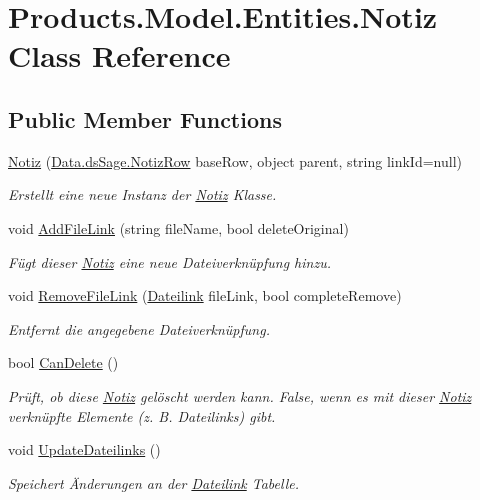 \hypertarget{class_products_1_1_model_1_1_entities_1_1_notiz}{}\section{Products.\+Model.\+Entities.\+Notiz Class Reference}
\label{class_products_1_1_model_1_1_entities_1_1_notiz}
\subsection*{Public Member Functions}
\begin{DoxyCompactItemize}
\item 
\hyperlink{class_products_1_1_model_1_1_entities_1_1_notiz_a720fd2cb505fe5f096dfdc912bbff98c}{Notiz} (\hyperlink{class_products_1_1_data_1_1ds_sage_1_1_notiz_row}{Data.\+ds\+Sage.\+Notiz\+Row} base\+Row, object parent, string link\+Id=null)
\begin{DoxyCompactList}\small\item\em Erstellt eine neue Instanz der \hyperlink{class_products_1_1_model_1_1_entities_1_1_notiz}{Notiz} Klasse. \end{DoxyCompactList}\item 
void \hyperlink{class_products_1_1_model_1_1_entities_1_1_notiz_a21e02ed088193b3b766e138fa271c359}{Add\+File\+Link} (string file\+Name, bool delete\+Original)
\begin{DoxyCompactList}\small\item\em Fügt dieser \hyperlink{class_products_1_1_model_1_1_entities_1_1_notiz}{Notiz} eine neue Dateiverknüpfung hinzu. \end{DoxyCompactList}\item 
void \hyperlink{class_products_1_1_model_1_1_entities_1_1_notiz_aab0b39db46404403796ade3ba244f9ab}{Remove\+File\+Link} (\hyperlink{class_products_1_1_model_1_1_entities_1_1_dateilink}{Dateilink} file\+Link, bool complete\+Remove)
\begin{DoxyCompactList}\small\item\em Entfernt die angegebene Dateiverknüpfung. \end{DoxyCompactList}\item 
bool \hyperlink{class_products_1_1_model_1_1_entities_1_1_notiz_ab9eb4bc50bbd6f51a1e362d5bab180ef}{Can\+Delete} ()
\begin{DoxyCompactList}\small\item\em Prüft, ob diese \hyperlink{class_products_1_1_model_1_1_entities_1_1_notiz}{Notiz} gelöscht werden kann. False, wenn es mit dieser \hyperlink{class_products_1_1_model_1_1_entities_1_1_notiz}{Notiz} verknüpfte Elemente (z. B. Dateilinks) gibt. \end{DoxyCompactList}\item 
void \hyperlink{class_products_1_1_model_1_1_entities_1_1_notiz_a4e46f3783817104a64aadd27356180f9}{Update\+Dateilinks} ()
\begin{DoxyCompactList}\small\item\em Speichert Änderungen an der \hyperlink{class_products_1_1_model_1_1_entities_1_1_dateilink}{Dateilink} Tabelle. \end{DoxyCompactList}\end{DoxyCompactItemize}
